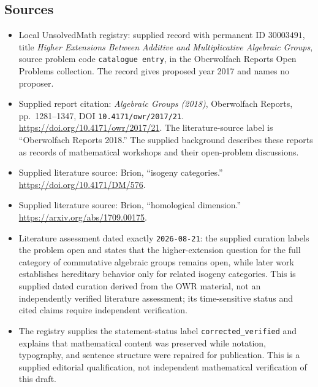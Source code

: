 \documentclass[11pt]{article}
\begin{document}
\subsection{Sources}
\begin{itemize}
\item Local UnsolvedMath registry: supplied record with permanent ID \(30003491\), title \emph{Higher Extensions Between Additive and Multiplicative Algebraic Groups}, source problem code \texttt{catalogue entry}, in the Oberwolfach Reports Open Problems collection. The record gives proposed year 2017 and names no proposer.
\item Supplied report citation: \emph{Algebraic Groups (2018)}, Oberwolfach Reports, pp.~1281--1347, DOI \texttt{10.4171/owr/2017/21}. \url{https://doi.org/10.4171/owr/2017/21}. The literature-source label is ``Oberwolfach Reports 2018.'' The supplied background describes these reports as records of mathematical workshops and their open-problem discussions.
\item Supplied literature source: Brion, ``isogeny categories.'' \url{https://doi.org/10.4171/DM/576}.
\item Supplied literature source: Brion, ``homological dimension.'' \url{https://arxiv.org/abs/1709.00175}.
\item Literature assessment dated exactly \texttt{2026-08-21}: the supplied curation labels the problem open and states that the higher-extension question for the full category of commutative algebraic groups remains open, while later work establishes hereditary behavior only for related isogeny categories. This is supplied dated curation derived from the OWR material, not an independently verified literature assessment; its time-sensitive status and cited claims require independent verification.
\item The registry supplies the statement-status label \texttt{corrected\_verified} and explains that mathematical content was preserved while notation, typography, and sentence structure were repaired for publication. This is a supplied editorial qualification, not independent mathematical verification of this draft.
\end{itemize}
\end{document}
